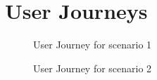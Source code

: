 \documentclass[5pt]{article} %
\begin{document}
\clearpage
\section{User Journeys}

\begin{figure}[h!]
\centering
{}
\caption{User Journey for scenario 1}
\end{figure}

\begin{figure}[h!]
\centering
{}
\caption{User Journey for scenario 2}
\end{figure}
\end{document}
